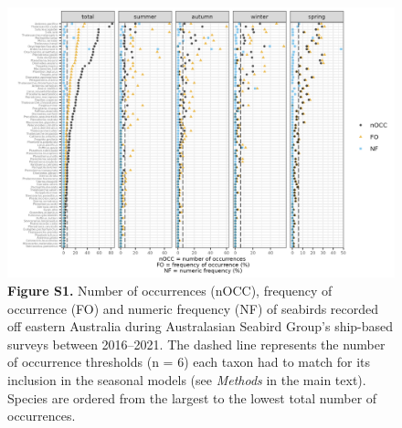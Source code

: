 \documentclass[
]{article}
\begin{document}
\begin{landscape}
\newpage

\begin{figure}
\centering
\includegraphics{../results/FigS1_spp-nOCC-FO-NF-seasons.png}
\caption{\textbf{Figure S1.} Number of occurrences (nOCC), frequency of
occurrence (FO) and numeric frequency (NF) of seabirds recorded off
eastern Australia during Australasian Seabird Group's ship-based surveys
between 2016--2021. The dashed line represents the number of occurrence
thresholds (n = 6) each taxon had to match for its inclusion in the
seasonal models (see \emph{Methods} in the main text). Species are
ordered from the largest to the lowest total number of occurrences.}
\end{figure}

\end{landscape}

\newpage
\end{document}
